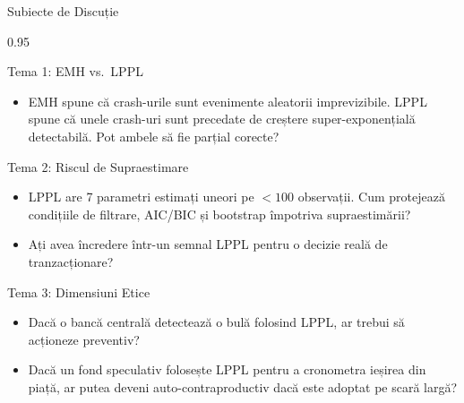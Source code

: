 \documentclass[9pt, aspectratio=169, t]{beamer}
\begin{document}
\begin{frame}{Subiecte de Discuție}
    \begin{cminipage}{0.95\textwidth}
    {\scriptsize
    \begin{block}{Tema 1: EMH vs.\ LPPL}
        \begin{itemize}\setlength{\itemsep}{0pt}
            \item EMH spune că crash-urile sunt evenimente aleatorii imprevizibile. LPPL spune că unele crash-uri sunt precedate de creștere super-exponențială detectabilă. Pot ambele să fie parțial corecte?
        \end{itemize}
    \end{block}

    \vspace{-2mm}

    \begin{alertblock}{Tema 2: Riscul de Supraestimare}
        \begin{itemize}\setlength{\itemsep}{0pt}
            \item LPPL are 7 parametri estimați uneori pe $<100$ observații. Cum protejează condițiile de filtrare, AIC/BIC și bootstrap împotriva supraestimării?
            \item Ați avea încredere într-un semnal LPPL pentru o decizie reală de tranzacționare?
        \end{itemize}
    \end{alertblock}

    \vspace{-2mm}

    \begin{exampleblock}{Tema 3: Dimensiuni Etice}
        \begin{itemize}\setlength{\itemsep}{0pt}
            \item Dacă o bancă centrală detectează o bulă folosind LPPL, ar trebui să acționeze preventiv?
            \item Dacă un fond speculativ folosește LPPL pentru a cronometra ieșirea din piață, ar putea deveni auto-contraproductiv dacă este adoptat pe scară largă?
        \end{itemize}
    \end{exampleblock}
    }
    \end{cminipage}
\end{frame}

\end{document}
